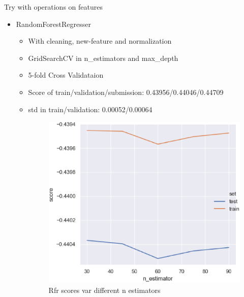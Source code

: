 \documentclass[
 size=12pt,
 paper=smartboard, %
 mode=present, %
 display=slides, %
style=tuliplab,
pauseslide,
fleqn,leqno]{powerdot}
\begin{document}
\begin{slide}{Try with operations on features}
  \begin{itemize}
    \item RandomForestRegresser
    \begin{itemize}
      \item With cleaning, new-feature and normalization
      \item GridSearchCV in n_estimators and max_depth
      \item 5-fold Cross Validataion
      \item Score of train/validation/submission: 0.43956/0.44046/0.44709
      \item std in train/validation: 0.00052/0.00064 
      \begin{figure}[h]
        \begin{minipage}[t]{0.4\linewidth}
          \centering
          \includegraphics[width=1.0\textwidth]{figures2/rfr-estimator.eps}
          \caption{Rfr scores var different n estimators}
          \label{fig:rfr-estimators}
        \end{minipage}
        \hfill
        \begin{minipage}[t]{0.4\linewidth}
          \centering

\end{minipage}
\end{figure}
\end{itemize}
\end{itemize}
\end{slide}
\end{document}
